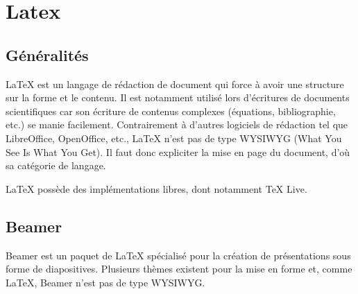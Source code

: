 \section{Latex}

\subsection{Généralités}
\LaTeX{} est un langage de rédaction de document qui force à avoir une structure sur la forme et le contenu. Il est notamment utilisé lors d'écritures de documents scientifiques car son écriture de contenus complexes (équations, bibliographie, etc.) se manie facilement.
Contrairement à d'autres logiciels de rédaction tel que LibreOffice, OpenOffice, etc., \LaTeX{} n'est pas de type WYSIWYG (What You See Is What You Get). Il faut donc expliciter la mise en page du document, d'où sa catégorie de langage.

\LaTeX{} possède des implémentations libres, dont notamment TeX Live.

\subsection{Beamer}
Beamer est un paquet de \LaTeX{} spécialisé pour la création de présentations sous forme de diapositives. Plusieurs thèmes existent pour la mise en forme et, comme \LaTeX{}, Beamer n'est pas de type WYSIWYG.

